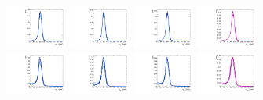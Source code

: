 \begin{figure}[htbp]
  \includegraphics[width=0.18\textwidth]{fig/2Dfit/templateSignalVsMX_fromDC_VBFGbuToWW_MJJ_mu_HP_nobb_LDy.pdf}
  \includegraphics[width=0.18\textwidth]{fig/2Dfit/templateSignalVsMX_fromDC_VBFRadToWW_MJJ_mu_HP_nobb_LDy.pdf}
  \includegraphics[width=0.18\textwidth]{fig/2Dfit/templateSignalVsMX_fromDC_VBFZprToWW_MJJ_mu_HP_nobb_LDy.pdf}
  \includegraphics[width=0.18\textwidth]{fig/2Dfit/templateSignalVsMX_fromDC_VBFWprToWZ_MJJ_mu_HP_nobb_LDy.pdf}\\
  \includegraphics[width=0.18\textwidth]{fig/2Dfit/templateSignalVsMX_fromDC_VBFGbuToWW_MJJ_mu_LP_nobb_LDy.pdf}
  \includegraphics[width=0.18\textwidth]{fig/2Dfit/templateSignalVsMX_fromDC_VBFRadToWW_MJJ_mu_LP_nobb_LDy.pdf}
  \includegraphics[width=0.18\textwidth]{fig/2Dfit/templateSignalVsMX_fromDC_VBFZprToWW_MJJ_mu_LP_nobb_LDy.pdf}
  \includegraphics[width=0.18\textwidth]{fig/2Dfit/templateSignalVsMX_fromDC_VBFWprToWZ_MJJ_mu_LP_nobb_LDy.pdf}\\

\end{figure}
